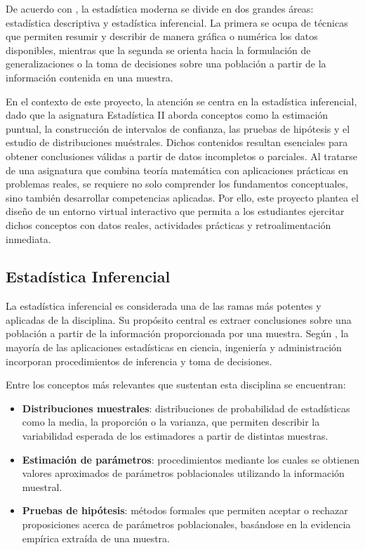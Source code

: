 \documentclass[letter,oneside,12pt,spanish]{report}
\begin{document}
De acuerdo con \textcite{montgomery1996}, la estadística moderna se divide en dos grandes áreas: estadística descriptiva y estadística inferencial. La primera se ocupa de técnicas que permiten resumir y describir de manera gráfica o numérica los datos disponibles, mientras que la segunda se orienta hacia la formulación de generalizaciones o la toma de decisiones sobre una población a partir de la información contenida en una muestra.

En el contexto de este proyecto, la atención se centra en la estadística inferencial, dado que la asignatura Estadística II aborda conceptos como la estimación puntual, la construcción de intervalos de confianza, las pruebas de hipótesis y el estudio de distribuciones muéstrales. Dichos contenidos resultan esenciales para obtener conclusiones válidas a partir de datos incompletos o parciales. Al tratarse de una asignatura que combina teoría matemática con aplicaciones prácticas en problemas reales, se requiere no solo comprender los fundamentos conceptuales, sino también desarrollar competencias aplicadas. Por ello, este proyecto plantea el diseño de un entorno virtual interactivo que permita a los estudiantes ejercitar dichos conceptos con datos reales, actividades prácticas y retroalimentación inmediata.

\subsection{Estadística Inferencial}

La estadística inferencial es considerada una de las ramas más potentes y aplicadas de la disciplina. Su propósito central es extraer conclusiones sobre una población a partir de la información proporcionada por una muestra. Según \textcite{montgomery1996}, la mayoría de las aplicaciones estadísticas en ciencia, ingeniería y administración incorporan procedimientos de inferencia y toma de decisiones.

Entre los conceptos más relevantes que sustentan esta disciplina se encuentran:

\begin{itemize}
	\item \textbf{Distribuciones muestrales}: distribuciones de probabilidad de estadísticas como la media, la proporción o la varianza, que permiten describir la variabilidad esperada de los estimadores a partir de distintas muestras.
	
	\item \textbf{Estimación de parámetros}: procedimientos mediante los cuales se obtienen valores aproximados de parámetros poblacionales utilizando la información muestral.
	
	\item \textbf{Pruebas de hipótesis}: métodos formales que permiten aceptar o rechazar proposiciones acerca de parámetros poblacionales, basándose en la evidencia empírica extraída de una muestra.
\end{itemize}
\end{document}
